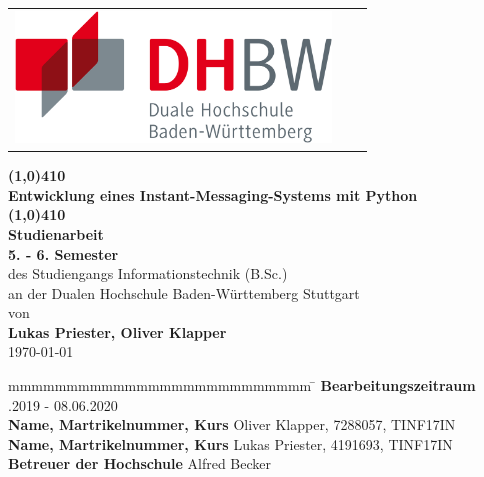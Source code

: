 \documentclass[a4paper,titlepage,halfparskip,12pt]{scrreprt}
\newcommand{\titel}{\line(1,0){410}\\ \bigskip Entwicklung eines Instant-Messaging-Systems mit Python\\\bigskip \line(1,0){410}}
\begin{document}
	

\begin{table}[h]
\centering
\begin{tabular}{lcr}
\includegraphics[height=3.5cm]{images/dhbw-logo}
\end{tabular}
\end{table}
\bigskip
\bigskip
\begin{center}
\vspace*{12mm} {\LARGE\textbf{\titel}}\\
\vspace*{12mm} {\large\textbf{Studienarbeit}}\\
\vspace*{3mm} {\large\textbf{5. - 6. Semester}}\\
\vspace*{12mm} des Studiengangs Informationstechnik (B.Sc.)\\ an der Dualen Hochschule Baden-Württemberg Stuttgart\\
\vspace*{12mm} von\\
\vspace*{3mm} {\large\textbf{Lukas Priester, Oliver Klapper}}\\
\vspace*{12mm} \today\\
\end{center}
\vfill
\begin{spacing}{1.5}
\begin{tabbing}
mmmmmmmmmmmmmmmmmmmmmmmmmm \= \kill
\textbf{Bearbeitungszeitraum} .2019 - 08.06.2020\\
\textbf{Name, Martrikelnummer, Kurs} \> Oliver Klapper, 7288057, TINF17IN \\
\textbf{Name, Martrikelnummer, Kurs} \> Lukas Priester, 4191693, TINF17IN \\
\textbf{Betreuer der Hochschule} \> Alfred Becker\\
\end{tabbing}
\end{spacing}
\newpage
\end{document}
